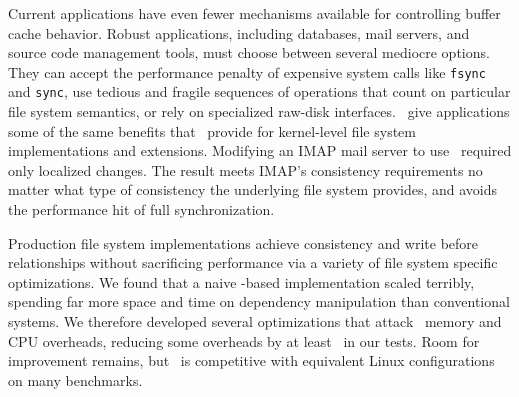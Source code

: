 Current applications have even fewer mechanisms available
 for controlling buffer cache behavior.
%
Robust applications, including databases, mail servers, and source code
 management tools, must choose between several mediocre options.
%
They can accept the performance penalty of expensive system calls like
 \texttt{fsync} and \texttt{sync}, use tedious and fragile sequences
 of operations that count on particular file system semantics, or
 rely on specialized raw-disk interfaces.
%
\Patchgroups\ give applications some of the same benefits that \patches\ provide
 for kernel-level file system implementations and extensions.
%
Modifying an IMAP mail server to use \patchgroups\ required only localized
 changes.  The result meets IMAP's consistency requirements no
 matter what type of consistency the underlying file system provides, and
 avoids the performance hit of full synchronization.


\begin{comment}
Our file system modules impose soft updates-style \patch\ requirements by
 default, since doing so requires some knowledge of the file system's
 structures; we have also written a journal module that can change
 existing dependencies to express either full or metadata-only journaling.
%
A file system module not interested in supporting soft updates support
 could instead impose no \patch\ requirements, and count on the journal
 module to provide a consistency guarantee.


The \Kudos\ storage system implementation is decomposed entirely into
 pluggable \modules\ that manipulate \patches, hopefully making the system
 as a whole more configurable, extensible, and easier to understand.
%
Any storage system \module\ can generate \patches; other modules can examine
 them and modify them when required.
%
\Patch\ dependencies are obeyed by all other storage system layers, allowing
 them to be passed through layers such as loopback block devices.
%
As a result, the loosely-coupled \modules\ that implement a file system
 can cooperate to enforce strong and often complex consistency guarantees,
 even though each \module\ only does a small part of the work.
\end{comment}


Production file system implementations achieve consistency and write before
 relationships without sacrificing performance via a variety of file
 system specific optimizations.
%
We found that a naive \patch-based implementation scaled terribly,
 spending far more space and time on dependency manipulation than
 conventional systems.
%
We therefore developed several optimizations that attack \patch\ memory and
 CPU overheads, reducing some overheads by at least \patchoptundo\ in our
 tests. 
%
Room for improvement remains, but \Featherstitch\ is
 competitive with equivalent Linux configurations on many benchmarks.


